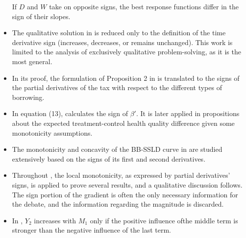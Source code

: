 \documentclass[11pt]{book}
\begin{document}
\begin{itemize}
If $D$ and $W$ take on opposite signs, the best response functions
differ in the sign of their slopes.
\item The qualitative solution in \cite{mazurova2017defining}
is reduced only to the definition of the time derivative sign (increases,
decreases, or remains unchanged). This work is limited to the analysis
of exclusively qualitative problem-solving, as it is the most general.
\item In its proof, the formulation of Proposition 2 in \cite{bengui2018macroprudential}
is translated to the signs of the partial derivatives of the tax with
respect to the different types of borrowing.
\item In equation (13), \cite{chemla2018subject}
calculates the sign of $\beta'$. It is later applied in propositions
about the expected treatment-control health quality difference given
some monotonicity assumptions.
\item The monotonicity and concavity of the BB-SSLD curve in \cite{mendoza2019positive}
are studied extensively based on the signs of its first and second
derivatives.
\item Throughout \cite{drozd2019credit},
the local monotonicity, as expressed by partial derivatives' signs,
is applied to prove several results, and a qualitative discussion
follows. The sign portion of the gradient is often the only necessary
information for the debate, and the information regarding the magnitude
is discarded.
\item In \cite{ferret2021green},
$Y_{2}$ increases with $M_{1}$ only if the positive influence ofthe
middle term is stronger than the negative influence of the last term.
\end{itemize}
\end{document}
